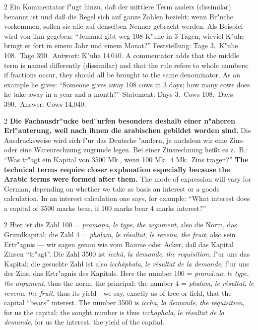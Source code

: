\documentclass[10pt,a4paper]{article}
\renewcommand{\switchcolumn}{\syncronize\nointerlineskip\columnbreak}
\newcommand{\enquote}[1]{``#1''}
\begin{document}
\begin{paracol}{2}
Ein Kommentator f"ugt hinzu, da\ss{} der mittlere Term anders (dissimilar) benannt ist und da\ss{} die Regel sich auf ganze Zahlen bezieht; wenn Br"uche vorkommen, sollen sie alle auf denselben Nenner gebracht werden. Als Beispiel wird von ihm gegeben: \enquote{Jemand gibt weg 108 K"uhe in 3 Tagen; wieviel K"uhe bringt er fort in einem Jahr und einem Monat?} Feststellung: Tage 3.\ K"uhe 108.\ Tage 390.\ Antwort: K"uhe 14\,040.
\switchcolumn
A commentator adds that the middle term is named differently (dissimilar) and that the rule refers to whole numbers; if fractions occur, they should all be brought to the same denominator. As an example he gives: ``Someone gives away 108 cows in 3 days; how many cows does he take away in a year and a month?'' Statement: Days 3.\ Cows 108.\ Days 390.\ Answer: Cows 14,040.
\end{paracol}

\begin{paracol}{2}
\textbf{Die Fachausdr"ucke bed"urfen besonders deshalb einer n"aheren Erl"auterung, weil nach ihnen die arabischen gebildet worden sind.} Die Ausdrucksweise wird sich f"ur das Deutsche "andern, je nachdem wir eine Zins- oder eine Warenrechnung zugrunde legen. Bei einer Zinsrechnung hei\ss{}t es z.\ B.: \enquote{Was tr"agt ein Kapital von 3500 Mk., wenn 100 Mk.\ 4 Mk.\ Zins tragen?}
\switchcolumn
\textbf{The technical terms require closer explanation especially because the Arabic terms were formed after them.} The mode of expression will vary for German, depending on whether we take as basis an interest or a goods calculation. In an interest calculation one says, for example: ``What interest does a capital of 3500 marks bear, if 100 marks bear 4 marks interest?''
\end{paracol}

\begin{paracol}{2}
Hier ist die Zahl 100 = \textit{pram\=a\d{n}a}, \textit{le type}, \textit{the argument}, also die Norm, das Grundkapital; die Zahl 4 = \textit{phalam}, \textit{le r\'esultat}, \textit{le revenu}, \textit{the fruit}, also sein Ertr"agnis --- wir sagen genau wie vom Baume oder Acker, da\ss{} das Kapital Zinsen \enquote{tr"agt}. Die Zahl 3500 ist \textit{icch\=a}, \textit{la demande}, \textit{the requisition}, f"ur uns das Kapital; die gesuchte Zahl ist also \textit{icch\=aphala}, \textit{le r\'esultat de la demande}, f"ur uns der Zins, das Ertr"agnis des Kapitals.
\switchcolumn
Here the number 100 = \textit{pram\=a.na}, \textit{le type}, \textit{the argument}, thus the norm, the principal; the number 4 = \textit{phalam}, \textit{le r\'esultat}, \textit{le revenu}, \textit{the fruit}, thus its yield---we say, exactly as of tree or field, that the capital ``bears'' interest. The number 3500 is \textit{icch\=a}, \textit{la demande}, \textit{the requisition}, for us the capital; the sought number is thus \textit{icch\=aphala}, \textit{le r\'esultat de la demande}, for us the interest, the yield of the capital.
\end{paracol}
\end{document}
